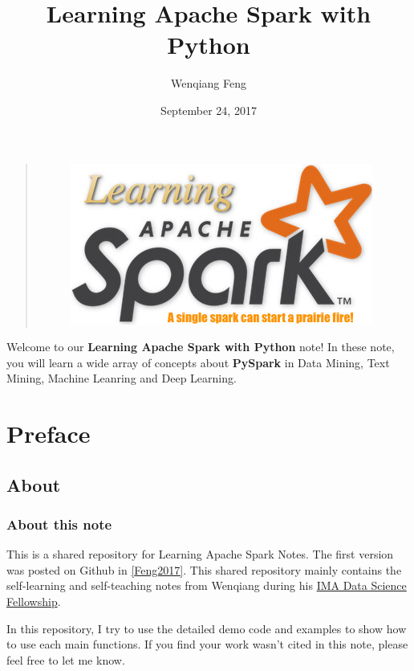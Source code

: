 \documentclass[letterpaper,11pt,english]{sphinxmanual}
\title{Learning Apache Spark with Python}
\date{September 24, 2017}
\author{Wenqiang Feng}
\begin{document}
\maketitle
\tableofcontents
{}\label{index::doc}\label{index:index}\begin{quote}
\begin{figure}[htbp]
\centering

\includegraphics{logo.jpg}
\label{index:fig-logo}\end{figure}
\end{quote}

Welcome to our \textbf{Learning Apache Spark with Python} note!
In these note, you will learn a wide array of concepts about
\textbf{PySpark} in Data Mining, Text Mining, Machine Leanring
and Deep Learning.




\chapter{Preface}
\label{preface:id1}\label{preface::doc}\label{preface:contents}\label{preface:preface}

\section{About}
\label{preface:about}

\subsection{About this note}
\label{preface:about-this-note}
This is a shared repository for Learning Apache Spark Notes.
The first version was posted on Github in {\hyperref[reference:feng2017]{{[}Feng2017{]}}}.
This shared repository mainly contains the self-learning and
self-teaching notes from Wenqiang during his \href{https://www.ima.umn.edu/2016-2017/SW1.23-3.10.17\#}{IMA Data Science
Fellowship}.

In this repository, I try to use the detailed demo code and
examples to show how to use each main functions. If you find
your work wasn’t cited in this note, please feel free to let
me know.
\end{document}
